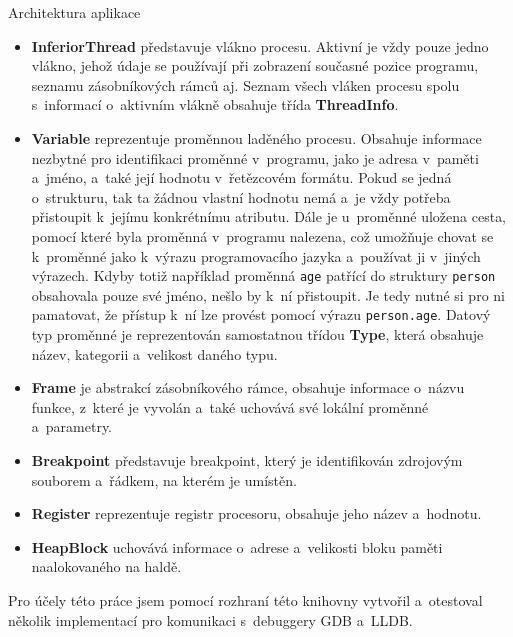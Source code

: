\documentclass[czech,bachelor,male,python,dept460,hidelinks]{diploma}						%
\begin{document}
\begin{section}{Architektura aplikace}
		\begin{itemize}
			\item \textbf{InferiorThread} představuje vlákno procesu. Aktivní je vždy pouze jedno vlákno, jehož údaje se používají při zobrazení současné
			pozice programu, seznamu zásobníkových rámců aj. Seznam všech vláken procesu spolu s~informací o~aktivním vlákně obsahuje třída \textbf{ThreadInfo}.
			\item \textbf{Variable} reprezentuje proměnnou laděného procesu.
			Obsahuje informace nezbytné pro identifikaci proměnné v~programu, jako je adresa v~paměti a~jméno, a~také její hodnotu v~řetězcovém formátu.
			Pokud se jedná o~strukturu, tak ta žádnou vlastní hodnotu nemá a~je vždy potřeba přistoupit k~jejímu konkrétnímu atributu.
			Dále je u~proměnné uložena cesta, pomocí které byla proměnná v~programu nalezena, což umožňuje chovat se k~proměnné
			jako k~výrazu programovacího jazyka a~používat ji v~jiných výrazech. Kdyby totiž například proměnná \texttt{age} patřící do struktury \texttt{person}
			obsahovala pouze své jméno, nešlo by k~ní přistoupit. Je tedy nutné si pro ni pamatovat, že přístup k~ní lze provést pomocí výrazu \texttt{person.age}.
			Datový typ proměnné je reprezentován samostatnou třídou \textbf{Type}, která obsahuje název, kategorii a~velikost daného typu.
			\item \textbf{Frame} je abstrakcí zásobníkového rámce, obsahuje informace o~názvu funkce, z~které je vyvolán a~také uchovává své lokální proměnné a~parametry.
			\item \textbf{Breakpoint} představuje breakpoint, který je identifikován zdrojovým souborem a~řádkem, na kterém je umístěn.
			\item \textbf{Register} reprezentuje registr procesoru, obsahuje jeho název a~hodnotu.
			\item \textbf{HeapBlock} uchovává informace o~adrese a~velikosti bloku paměti naalokovaného na haldě.
		\end{itemize}
		
		Pro účely této práce jsem pomocí rozhraní této knihovny vytvořil a~otestoval několik implementací pro komunikaci s~debuggery GDB a~LLDB.


\end{section}
\end{document}
